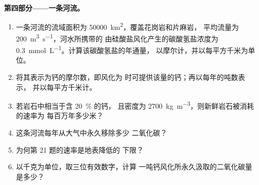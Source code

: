 \begin{problem}
\medskip
\noindent\textbf{第四部分——一条河流。}
\begin{enumerate}[resume]
  \item 一条河流的流域面积为 \qty{50000}{km^2}，覆盖花岗岩和片麻岩，
        平均流量为 \qty{200}{m^3.s^{-1}}，河水所携带的
        由硅酸盐风化产生的碳酸氢盐浓度为 \qty{0.3}{mmol.L^{-1}}。计算该碳酸氢盐的年通量，
        以摩尔计，并以每平方千米为单位。
  \item 将其表示为钙的摩尔数，即风化为
        时可提供该量的钙；再以每年的吨数表示，
        并以每平方千米计。
  \item 若岩石中相当于含 \qty{20}{\percent} 的钙，
        且密度为 \qty{2700}{kg.m^{-3}}，则新鲜岩石被消耗的速率为
        每百万年多少米？
  \item 这条河流每年从大气中永久移除多少
        二氧化碳？
  \item 为何第 21 题的速率是地表降低的
        下限？
  \item 以千克为单位，取三位有效数字，计算
        一吨钙风化所永久汲取的二氧化碳量是多少？
\end{enumerate}
\end{problem}
